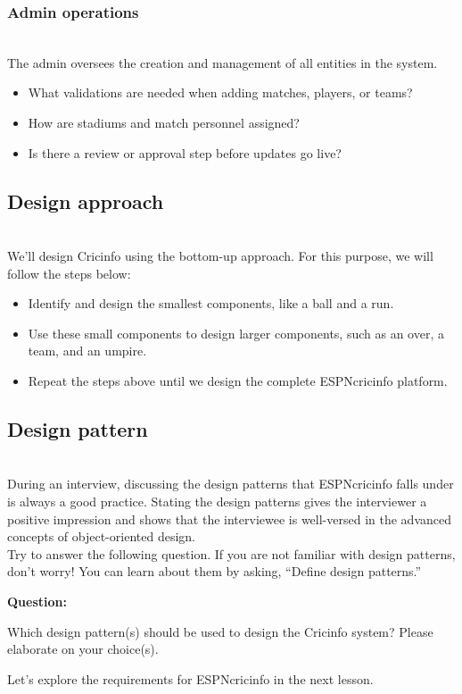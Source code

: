\subsubsection{Admin operations}\label{_ERYWz5WK1_YzwsmCbUD5}
\\
The admin oversees the creation and management of all entities in the system.

\begin{itemize}
\item
\protect{}\label{BnbOR0EJdQgJld3RtFIQn}
What validations are needed when adding matches, players, or teams?
\item
\protect{}\label{wHJXi6b1hUqzAnRwvFhc0}
How are stadiums and match personnel assigned?
\item
\protect{}\label{Lwr90GTbrcR5QZKdnhkE2}
Is there a review or approval step before updates go live?
\end{itemize}

\subsection{Design approach}\label{jm1e21p9FThwea5VKBcnN}
\\
We'll design Cricinfo using the bottom-up approach. For this purpose, we will follow the steps below:

\begin{itemize}
\item
\protect{}\label{QX-Zui5p7LPdlh9JYvzN4}
Identify and design the smallest components, like a ball and a run.
\item
\protect{}\label{5RQOXIKhFR2AnHkRk1iFi}
Use these small components to design larger components, such as an over, a team, and an umpire.
\item
\protect{}\label{0g7y3rcGDHAvhxJyUcPRh}
Repeat the steps above until we design the complete ESPNcricinfo platform.
\end{itemize}

\subsection{Design pattern~}\label{WfezANT5h4UD7KowbRqQH}
\\
During an interview, discussing the design patterns that ESPNcricinfo falls under is always a good practice. Stating the design patterns gives the interviewer a positive impression and shows that the interviewee is well-versed in the advanced concepts of object-oriented design.
\\
Try to answer the following question. If you are not familiar with design patterns, don't worry! You can learn about them by asking, ``Define design patterns.''

\textbf{Question:}

Which design pattern(s) should be used to design the Cricinfo system? Please elaborate on your choice(s).

Let's explore the requirements for ESPNcricinfo in the next lesson.

\subsection{}\label{M9-YDfJ3O0hpngktvq5Uz}

